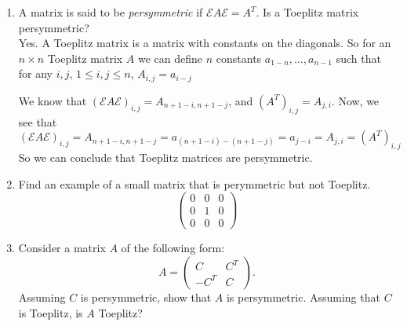 \documentclass[11pt]{article}
\newcommand{\Eps}{\mathcal{E}}
\newcommand{\n}{\vspace{0.2cm}}
\begin{document}
\begin{enumerate}
\begin{enumerate}[label=(\alph*)]
		      \item A matrix is said to be \textit{persymmetric} if \(\Eps A \Eps = A^T\).  Is a Toeplitz matrix persymmetric? \n\\
		            Yes.  A Toeplitz matrix is a matrix with constants on the diagonals.  So for an \(n \times n\) Toeplitz matrix \(A\) we can define \(n\) constants \(a_{1-n}, \dots, a_{n-1}\) such that for any \(i,j\), \(1 \leq i,j \leq n\), \(A_{i,j} = a_{i-j}\)

		            We know that \((\Eps A \Eps)_{i,j} = A_{n+1-i,n+1-j}\), and \((A^T)_{i,j} = A_{j,i}\).  Now, we see that
		            \[(\Eps A \Eps)_{i,j} = A_{n+1-i,n+1-j} = a_{(n+1-i)-(n+1-j)} = a_{j-i} = A_{j,i} = (A^T)_{i,j}\]
		            So we can conclude that Toeplitz matrices are persymmetric.

		      \item Find an example of a small matrix that is perymmetric but not Toeplitz.
		            \[\begin{pmatrix} 0 & 0 & 0 \\ 0 & 1 & 0 \\ 0 & 0 & 0 \end{pmatrix} \]
		      \item Consider a matrix \(A\) of the following form:
		            \[A = \begin{pmatrix} C & C^T \\ -C^T & C \end{pmatrix}.\]
		            Assuming \(C\) is persymmetric, show that \(A\) is persymmetric.  Assuming that \(C\) is Toeplitz, is \(A\) Toeplitz?


\end{enumerate}
\end{enumerate}
\end{document}

